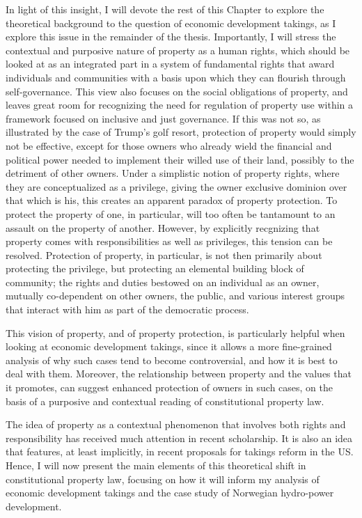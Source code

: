 In light of this insight, I will devote the rest of this Chapter to explore the theoretical background to the question of economic development takings, as I explore this issue in the remainder of the thesis. Importantly, I will stress the contextual and purposive nature of property as a human rights, which should be looked at as an integrated part in a system of fundamental rights that award individuals and communities with a basis upon which they can flourish through self-governance. This view also focuses on the social obligations of property, and leaves great room for recognizing the need for regulation of property use within a framework focused on inclusive and just governance. If this was not so, as illustrated by the case of Trump's golf resort, protection of property would simply not be effective, except for those owners who already wield the financial and political power needed to implement their willed use of their land, possibly to the detriment of other owners. Under a simplistic notion of property rights, where they are conceptualized as a privilege, giving the owner exclusive dominion over that which is his, this creates an apparent paradox of property protection. To protect the property of one, in particular, will too often be tantamount to an assault on the property of another. However, by explicitly recgnizing that property comes with responsibilities as well as privileges, this tension can be resolved. Protection of property, in particular, is not then primarily about protecting the privilege, but protecting an elemental building block of community; the rights and duties bestowed on an individual as an owner, mutually co-dependent on other owners, the public, and various interest groups that interact with him as part of the democratic process.

This vision of property, and of property protection, is particularly helpful when looking at economic development takings, since it allows a more fine-grained analysis of why such cases tend to become controversial, and how it is best to deal with them. Moreover, the relationship between property and the values that it promotes, can suggest enhanced protection of owners in such cases, on the basis of a purposive and contextual reading of constitutional property law. 

The idea of property as a contextual phenomenon that involves both rights and responsibility has received much attention in recent scholarship. It is also an idea that features, at least implicitly, in recent proposals for takings reform in the US. Hence, I will now present the main elements of this theoretical shift in constitutional property law, focusing on how it will inform my analysis of economic development takings and the case study of Norwegian hydro-power development.